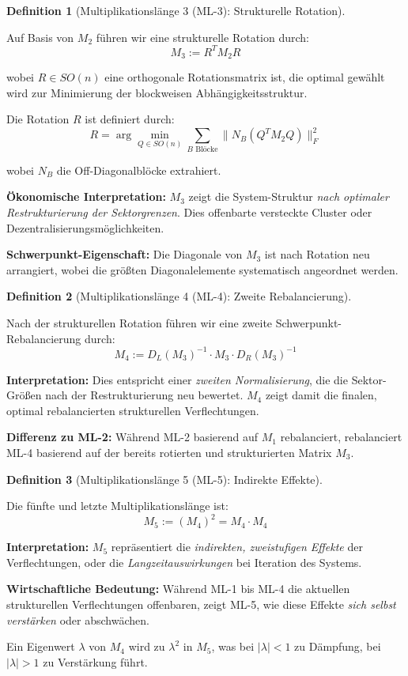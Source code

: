 \documentclass[a4paper,12pt]{article}
\theoremstyle{definition}
\newtheorem{definition}{Definition}
\begin{document}
\begin{definition}[Multiplikationslänge 3 (ML-3): Strukturelle Rotation]
\label{def:ml3}

Auf Basis von $M_2$ führen wir eine strukturelle Rotation durch:
\[
M_3 := R^T M_2 R
\]

wobei $R \in SO(n)$ eine orthogonale Rotationsmatrix ist, die optimal gewählt wird zur Minimierung der blockweisen Abhängigkeitsstruktur.

Die Rotation $R$ ist definiert durch:
\[
R = \arg\min_{Q \in SO(n)} \sum_{B \text{ Blöcke}} \|N_B(Q^T M_2 Q)\|_F^2
\]

wobei $N_B$ die Off-Diagonalblöcke extrahiert.

\textbf{Ökonomische Interpretation:} $M_3$ zeigt die System-Struktur \emph{nach optimaler Restrukturierung der Sektorgrenzen}. Dies offenbarte versteckte Cluster oder Dezentralisierungsmöglichkeiten.

\textbf{Schwerpunkt-Eigenschaft:} Die Diagonale von $M_3$ ist nach Rotation neu arrangiert, wobei die größten Diagonalelemente systematisch angeordnet werden.
\end{definition}

\begin{definition}[Multiplikationslänge 4 (ML-4): Zweite Rebalancierung]
\label{def:ml4}

Nach der strukturellen Rotation führen wir eine zweite Schwerpunkt-Rebalancierung durch:
\[
M_4 := D_L(M_3)^{-1} \cdot M_3 \cdot D_R(M_3)^{-1}
\]

\textbf{Interpretation:} Dies entspricht einer \emph{zweiten Normalisierung}, die die Sektor-Größen nach der Restrukturierung neu bewertet. $M_4$ zeigt damit die finalen, optimal rebalancierten strukturellen Verflechtungen.

\textbf{Differenz zu ML-2:} Während ML-2 basierend auf $M_1$ rebalanciert, rebalanciert ML-4 basierend auf der bereits rotierten und strukturierten Matrix $M_3$.
\end{definition}

\begin{definition}[Multiplikationslänge 5 (ML-5): Indirekte Effekte]
\label{def:ml5}

Die fünfte und letzte Multiplikationslänge ist:
\[
M_5 := (M_4)^2 = M_4 \cdot M_4
\]

\textbf{Interpretation:} $M_5$ repräsentiert die \emph{indirekten, zweistufigen Effekte} der Verflechtungen, oder die \emph{Langzeitauswirkungen} bei Iteration des Systems.

\textbf{Wirtschaftliche Bedeutung:} Während ML-1 bis ML-4 die aktuellen strukturellen Verflechtungen offenbaren, zeigt ML-5, wie diese Effekte \emph{sich selbst verstärken} oder abschwächen.

Ein Eigenwert $\lambda$ von $M_4$ wird zu $\lambda^2$ in $M_5$, was bei $|\lambda| < 1$ zu Dämpfung, bei $|\lambda| > 1$ zu Verstärkung führt.
\end{definition}
\end{document}
